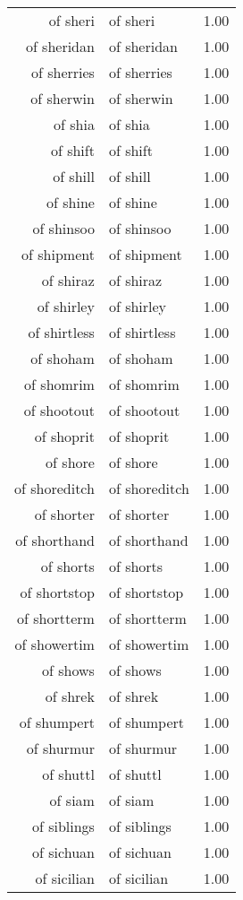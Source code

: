 \begin{table}[ht]
\begin{tabular}{rlr}
  of sheri & of sheri & 1.00 \\ 
  of sheridan & of sheridan & 1.00 \\ 
  of sherries & of sherries & 1.00 \\ 
  of sherwin & of sherwin & 1.00 \\ 
  of shia & of shia & 1.00 \\ 
  of shift & of shift & 1.00 \\ 
  of shill & of shill & 1.00 \\ 
  of shine & of shine & 1.00 \\ 
  of shinsoo & of shinsoo & 1.00 \\ 
  of shipment & of shipment & 1.00 \\ 
  of shiraz & of shiraz & 1.00 \\ 
  of shirley & of shirley & 1.00 \\ 
  of shirtless & of shirtless & 1.00 \\ 
  of shoham & of shoham & 1.00 \\ 
  of shomrim & of shomrim & 1.00 \\ 
  of shootout & of shootout & 1.00 \\ 
  of shoprit & of shoprit & 1.00 \\ 
  of shore & of shore & 1.00 \\ 
  of shoreditch & of shoreditch & 1.00 \\ 
  of shorter & of shorter & 1.00 \\ 
  of shorthand & of shorthand & 1.00 \\ 
  of shorts & of shorts & 1.00 \\ 
  of shortstop & of shortstop & 1.00 \\ 
  of shortterm & of shortterm & 1.00 \\ 
  of showertim & of showertim & 1.00 \\ 
  of shows & of shows & 1.00 \\ 
  of shrek & of shrek & 1.00 \\ 
  of shumpert & of shumpert & 1.00 \\ 
  of shurmur & of shurmur & 1.00 \\ 
  of shuttl & of shuttl & 1.00 \\ 
  of siam & of siam & 1.00 \\ 
  of siblings & of siblings & 1.00 \\ 
  of sichuan & of sichuan & 1.00 \\ 
  of sicilian & of sicilian & 1.00 \\ 

\end{tabular}
\end{table}
